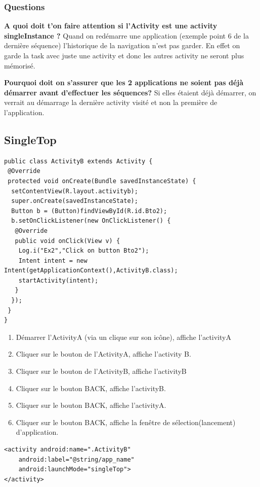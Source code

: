			\subsubsection{Questions}
			\textbf{A quoi doit t’on faire attention si l’Activity est une activity singleInstance ? } Quand on redémarre une application (exemple point 6 de la dernière séquence) l'historique de la navigation n'est pas garder. En effet on garde la task avec juste une activity et donc les autres activity ne seront plus mémorisé.
			
			\textbf{Pourquoi doit on s’assurer que les 2 applications ne soient pas déjà démarrer avant d’effectuer les séquences?} Si elles étaient déjà démarrer, on  verrait au démarrage la dernière activity visité et non la première de l'application.

	\subsection{SingleTop}
	\begin{lstlisting}
public class ActivityB extends Activity {
 @Override
 protected void onCreate(Bundle savedInstanceState) {
  setContentView(R.layout.activityb);
  super.onCreate(savedInstanceState);
  Button b = (Button)findViewById(R.id.Bto2);
  b.setOnClickListener(new OnClickListener() {
   @Override
   public void onClick(View v) {
    Log.i("Ex2","Click on button Bto2");
    Intent intent = new Intent(getApplicationContext(),ActivityB.class);
    startActivity(intent);
   }
  });
 }
}
	\end{lstlisting}
	\begin{enumerate}
			\item Démarrer l'ActivityA (via un clique sur son icône), affiche l'activityA
			\item Cliquer sur le bouton de l’ActivityA, affiche l'activity B.
			\item  Cliquer sur le bouton de l’ActivityB, affiche l'activityB
			\item Cliquer sur le bouton BACK, affiche l'activityB.
			\item Cliquer sur le bouton BACK, affiche l'activityA.
			\item Cliquer sur le bouton BACK, affiche la fenêtre de sélection(lancement) d'application.
	\end{enumerate}
\begin{lstlisting}
<activity android:name=".ActivityB"
    android:label="@string/app_name" 
    android:launchMode="singleTop">
</activity>
\end{lstlisting}

